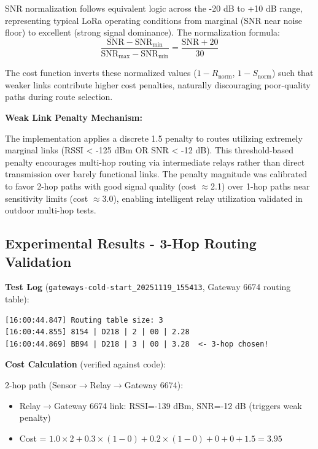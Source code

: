 SNR normalization follows equivalent logic across the -20 dB to +10 dB range, representing typical LoRa operating conditions from marginal (SNR near noise floor) to excellent (strong signal dominance). The normalization formula:
\begin{equation}
\frac{\text{SNR} - \text{SNR}_{\min}}{\text{SNR}_{\max} - \text{SNR}_{\min}} = \frac{\text{SNR} + 20}{30}
\end{equation}

The cost function inverts these normalized values ($1 - R_{\text{norm}}$, $1 - S_{\text{norm}}$) such that weaker links contribute higher cost penalties, naturally discouraging poor-quality paths during route selection.

\textbf{Weak Link Penalty Mechanism:}

The implementation applies a discrete 1.5 penalty to routes utilizing extremely marginal links (RSSI < -125 dBm OR SNR < -12 dB). This threshold-based penalty encourages multi-hop routing via intermediate relays rather than direct transmission over barely functional links. The penalty magnitude was calibrated to favor 2-hop paths with good signal quality (cost $\approx$2.1) over 1-hop paths near sensitivity limits (cost $\approx$3.0), enabling intelligent relay utilization validated in outdoor multi-hop tests.

\subsection{Experimental Results - 3-Hop Routing Validation}
\label{sec:3hop-validation}

\textbf{Test Log} (\texttt{gateways-cold-start\_20251119\_155413}, Gateway 6674 routing table):

\begin{verbatim}
[16:00:44.847] Routing table size: 3
[16:00:44.855] 8154 | D218 | 2 | 00 | 2.28
[16:00:44.869] BB94 | D218 | 3 | 00 | 3.28  <- 3-hop chosen!
\end{verbatim}

\textbf{Cost Calculation} (verified against code):

2-hop path (Sensor$\rightarrow$Relay$\rightarrow$Gateway 6674):
\begin{itemize}
\item Relay$\rightarrow$Gateway 6674 link: RSSI=-139 dBm, SNR=-12 dB (triggers weak penalty)
\item Cost = $1.0 \times 2 + 0.3 \times (1-0) + 0.2 \times (1-0) + 0 + 0 + 1.5 = 3.95$
\end{itemize}

